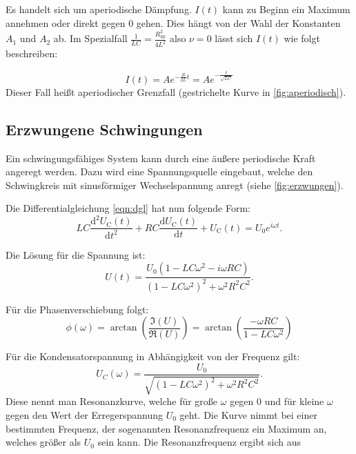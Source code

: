 Es handelt sich um aperiodische Dämpfung. $I(t)$ kann zu Beginn ein Maximum annehmen oder direkt gegen 0 gehen. Dies hängt von der Wahl der Konstanten $A_{1}$ und $A_{2}$ ab.
Im Spezialfall $\frac{1}{LC} = \frac{R_{\mathrm{ap}}^2}{4L^2}$ also $\nu = 0$
lässt sich $I(t)$ wie folgt beschreiben:

\begin{equation}
  I(t) = A e^{-\frac{R}{2L}t} = A e^{-\frac{t}{\sqrt{LC}}}
\end{equation}
Dieser Fall heißt aperiodischer Grenzfall (gestrichelte Kurve in \ref{fig:aperiodisch}).

\subsection{Erzwungene Schwingungen}
Ein schwingungsfähiges System kann durch eine äußere periodische Kraft angeregt werden. Dazu wird eine Spannungsquelle eingebaut, welche den Schwingkreis mit sinusförmiger Wechselspannung anregt (siehe \ref{fig:erzwungen}).


Die Differentialgleichung \ref{eqn:dgl} hat nun folgende Form:
\begin{equation}
  LC \frac{\mathrm{d}^2 U_{\mathrm C}(t)}{\mathrm{d}t^2} + RC \frac{\mathrm{d}U_{\mathrm C}(t)}{\mathrm{d}t} + U_{\mathrm C}(t) = U_0 e^{i\omega t}.
\end{equation}

Die Lösung für die Spannung ist:
\begin{equation}
  U(t) = \frac{U_0(1-LC\omega^2 - i\omega RC)}{(1 - LC\omega^2)^2 + \omega^2 R^2 C^2}.
\end{equation}

Für die Phasenverschiebung folgt:
\begin{equation}
  \phi(\omega) = \arctan \left(\frac{\Im(U)}{\Re(U)}\right) = \arctan \left(\frac{-\omega RC}{1 - LC\omega^2}\right)
\end{equation}

Für die Kondensatorspannung in Abhängigkeit von der Frequenz gilt:
\begin{equation}
\label{eqn:resonanz}
U_C(\omega) = \frac{U_0}{\sqrt{\left(1 - LC\omega^2 \right)^2 + \omega^2R^2C^2}}.
\end{equation}
Diese nennt man Resonanzkurve, welche für große $\omega$ gegen 0 und für kleine $\omega$ gegen den Wert der Erregerspannung $U_0$ geht. Die Kurve nimmt bei einer bestimmten Frequenz, der sogenannten Resonanzfrequenz ein Maximum an, welches größer als $U_0$ sein kann. Die Resonanzfrequenz ergibt sich aus

